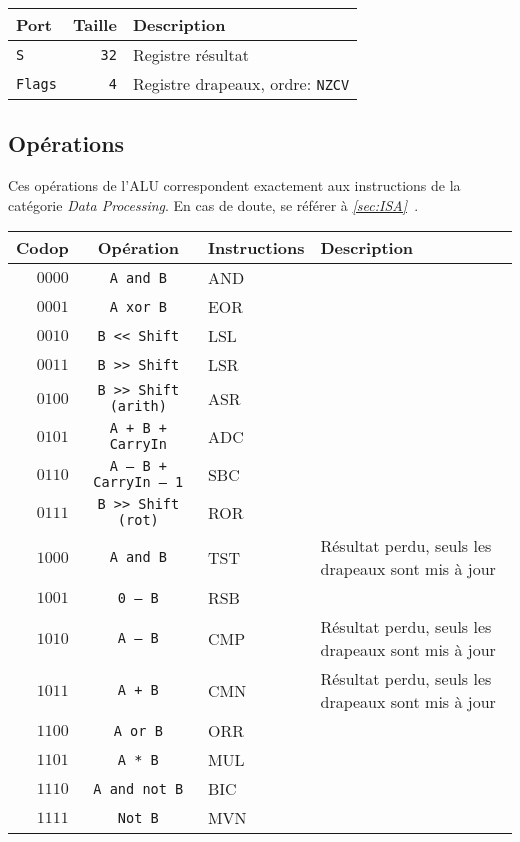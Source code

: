 \begin{tabular}{|l|r|l|}
\hline 
\textbf{Port} & \textbf{Taille} & \textbf{Description}\\
\hline

\texttt{S}	& \texttt{32} & Registre résultat\\
\hline
\texttt{Flags}	&  \texttt{4} & Registre drapeaux, ordre: \texttt{NZCV}\\

\hline
\end{tabular}


\subsection{Opérations}
Ces opérations de l'ALU correspondent exactement aux instructions de la catégorie \textit{Data Processing}. En cas de doute, se référer à \textit{\ref{sec:ISA}~}.

\begin{tabular}{|r|c|l|l|}
\hline
\textbf{Codop}  & \textbf{Opération}	& \textbf{Instructions} & \textbf{Description}\\
\hline

$0000$ & \texttt{A and B}			& AND			&\\
\hline
$0001$ & \texttt{A xor B}			& EOR			&\\
\hline
$0010$ & \texttt{B << Shift}			& LSL			&\\
\hline
$0011$ & \texttt{B >> Shift}			& LSR			&\\
\hline
$0100$ & \texttt{B >> Shift (arith)}		& ASR			&\\
\hline
$0101$ & \texttt{A + B + CarryIn}		& ADC			&\\
\hline
$0110$ & \texttt{A – B + CarryIn – 1}		& SBC			&\\
\hline
$0111$ & \texttt{B >> Shift (rot)}		& ROR			&\\
\hline
$1000$ & \texttt{A and B}			& TST			& Résultat perdu, seuls les drapeaux sont mis à jour\\
\hline
$1001$ & \texttt{0 – B}				& RSB			&\\
\hline
$1010$ & \texttt{A – B}				& CMP			& Résultat perdu, seuls les drapeaux sont mis à jour\\
\hline
$1011$ & \texttt{A + B}				& CMN			& Résultat perdu, seuls les drapeaux sont mis à jour\\
\hline
$1100$ & \texttt{A or B}			& ORR			&\\
\hline
$1101$ & \texttt{A * B}				& MUL			&\\
\hline
$1110$ & \texttt{A and not B}			& BIC			&\\
\hline
$1111$ & \texttt{Not B}				& MVN			&\\
\hline
\end{tabular}

